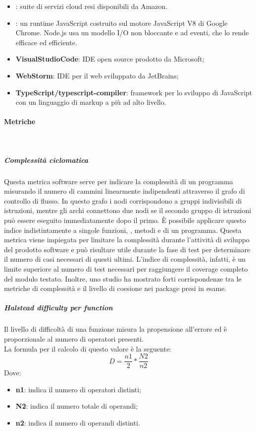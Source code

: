 \documentclass[../NormeDiProgetto_v3.0.0.tex]{subfiles}
\begin{document}
\begin{itemize}
				\item \textbf{}: suite di servizi cloud resi disponibili da Amazon.
				
				\item \textbf{}: un runtime JavaScript costruito sul motore JavaScript V8 di Google Chrome. Node.js usa un modello I/O non bloccante e ad eventi, che lo rende efficace ed efficiente.
			
				\item \textbf{VisualStudioCode}: IDE open source prodotto da Microsoft;

				\item \textbf{WebStorm}: IDE per il web sviluppato da JetBrains;

				\item \textbf{TypeScript/typescript-compiler}: framework per lo sviluppo di JavaScript con un linguaggio di markup a più ad alto livello.
			\end{itemize}

			\paragraph{Metriche}\mbox{}\\
			\subparagraph{Complessità ciclomatica}
			Questa metrica software serve per indicare la complessità di un programma misurando il numero di cammini linearmente indipendenti attraverso il grafo di controllo di flusso. In questo grafo i nodi corrispondono a gruppi indivisibili di istruzioni, mentre gli archi connettono due nodi se il secondo gruppo di istruzioni può essere eseguito immediatamente dopo il primo. È possibile applicare questo indice indistintamente a singole funzioni, , metodi e  di un programma. Questa metrica viene impiegata per limitare la complessità durante l'attività di sviluppo del prodotto software e può risultare utile durante la fase di test per determinare il numero di casi necessari di questi ultimi. L'indice di complessità, infatti, è un limite superiore al numero di test necessari per raggiungere il coverage completo del modulo testato. Inoltre, uno studio ha mostrato forti corrispondenze tra le metriche di complessità e il livello di coesione nei package presi in esame.\\
			
			\subparagraph{Halstead difficulty per function}
				Il livello di difficoltà di una funzione misura la propensione all'errore ed è proporzionale al numero di operatori presenti.\\
				La formula per il calcolo di questo valore è la seguente:
				\begin{equation*}
					D = \frac{n1}{2} * \frac{N2}{n2}
				\end{equation*}
				Dove:
				\begin{itemize}
					\item \textbf{n1}: indica il numero di operatori distinti;
					\item \textbf{N2}: indica il numero totale di operandi;
					\item \textbf{n2}: indica il numero di operandi distinti.
				\end{itemize}
\end{document}
